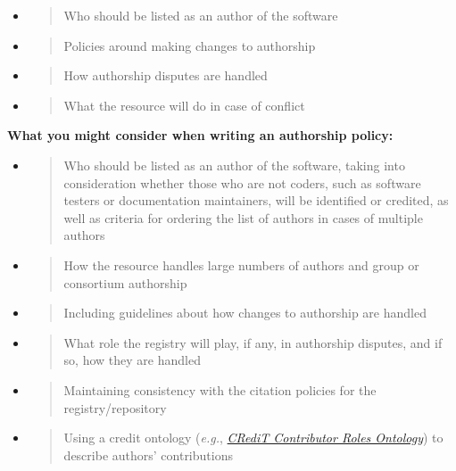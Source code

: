 \documentclass[]{article}
\begin{document}
\begin{itemize}
\item
  \begin{quote}
  Who should be listed as an author of the software
  \end{quote}
\item
  \begin{quote}
  Policies around making changes to authorship
  \end{quote}
\item
  \begin{quote}
  How authorship disputes are handled
  \end{quote}
\item
  \begin{quote}
  What the resource will do in case of conflict
  \end{quote}
\end{itemize}

\textbf{What you might consider when writing an authorship policy:}

\begin{itemize}
\item
  \begin{quote}
  Who should be listed as an author of the software, taking into
  consideration whether those who are not coders, such as software
  testers or documentation maintainers, will be identified or credited,
  as well as criteria for ordering the list of authors in cases of
  multiple authors
  \end{quote}
\item
  \begin{quote}
  How the resource handles large numbers of authors and group or
  consortium authorship
  \end{quote}
\item
  \begin{quote}
  Including guidelines about how changes to authorship are handled
  \end{quote}
\item
  \begin{quote}
  What role the registry will play, if any, in authorship disputes, and
  if so, how they are handled
  \end{quote}
\item
  \begin{quote}
  Maintaining consistency with the citation policies for the
  registry/repository
  \end{quote}
\item
  \begin{quote}
  Using a credit ontology (\emph{e.g.},
  \href{https://casrai.org/credit/}{\emph{CRediT Contributor Roles
  Ontology}}) to describe authors' contributions
  \end{quote}
\end{itemize}
\end{document}

